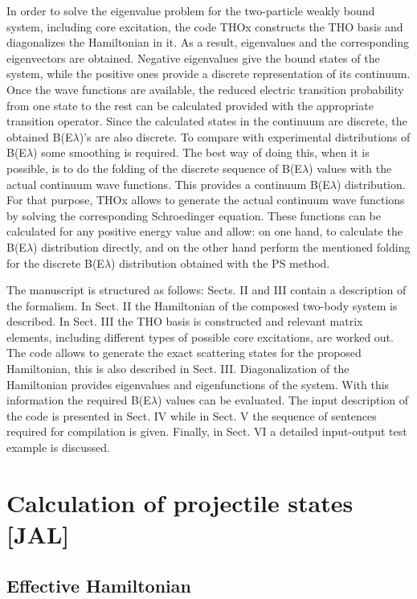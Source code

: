 \documentclass[preprint,12pt]{elsarticle}
\begin{document}
In order to solve the eigenvalue problem for the two-particle weakly bound
system, including core excitation, the code THOx constructs the THO
basis and diagonalizes the Hamiltonian in it. As a result,
eigenvalues and the corresponding eigenvectors
are obtained. Negative eigenvalues give the bound states of the system, while
the positive ones provide a discrete representation of its continuum. Once the
wave
functions are available, the reduced electric transition probability from one
state to the rest can be calculated provided with the appropriate transition
operator.
Since the calculated states in the continuum are discrete, the obtained
B(E$\lambda$)'s
are also discrete. To compare with experimental distributions of B(E$\lambda$)
some smoothing is required. The best way of doing this, when it is possible, is
to do the folding of the discrete sequence of B(E$\lambda$) values with the
actual continuum wave functions. This provides a continuum B(E$\lambda$)
distribution. For that purpose, THOx allows to generate the actual continuum
wave functions by solving the corresponding Schroedinger equation. These
functions can be calculated for any positive energy value and allow: on one
hand, to calculate the B(E$\lambda$) distribution directly, and on the other
hand perform the mentioned folding for the discrete B(E$\lambda$) distribution
obtained with the PS method.

The manuscript is structured as follows: Sects. II and III contain a
description of the
formalism. In Sect. II the Hamiltonian of the composed two-body
system is
described. In Sect. III the THO basis is constructed and relevant matrix
elements,
including different types of possible core excitations, are worked
out. The code
allows to generate the exact scattering states for the proposed Hamiltonian,
this is also described in Sect. III.
Diagonalization of the Hamiltonian provides eigenvalues and eigenfunctions of
the system. With this information the required B(E$\lambda$) values can be
evaluated. The input description of the code is presented in Sect. IV  while in
Sect. V the sequence of sentences required for compilation is given. Finally, in
Sect. VI a detailed input-output test example is discussed.



\section{Calculation of projectile states [JAL]}
\subsection{Effective Hamiltonian} %
\end{document}
